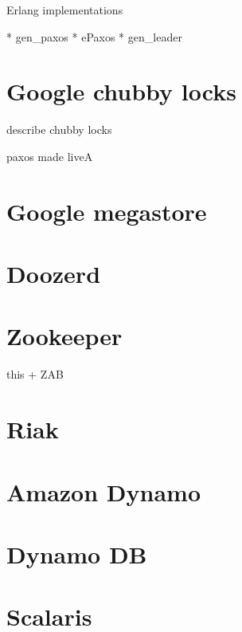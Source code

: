 Erlang implementations

* gen\_paxos
* ePaxos
* gen\_leader

\section{Google chubby locks}

describe chubby locks

paxos made liveA

\section{Google megastore}

\section{Doozerd}

\section{Zookeeper}

this + ZAB

\section{Riak}

\section{Amazon Dynamo}

\section{Dynamo DB}

\section{Scalaris}

